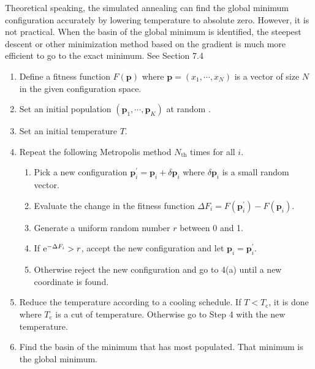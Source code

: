 Theoretical speaking, the simulated annealing can find the global minimum configuration accurately by lowering temperature to absolute zero.  However, it is not practical.  When the basin of the global minimum is identified, the steepest descent or other minimization method based on the gradient is much more efficient to go to the exact minimum. See Section 7.4
\bigskip
\begin{myalgobox}
\label{algo:sa}

\medskip
\begin{minipage}{5.5in}
\small
\begin{enumerate}
\item Define a fitness function $F(\mathbf{p})$ where $\mathbf{p}=(x_1, \cdots, x_N)$ is a vector of size $N$ in the given configuration space.
\item Set an initial population $(\mathbf{p}_1, \cdots, \mathbf{p}_K)$ at random .
\item Set an initial temperature $T$.
\item Repeat the following Metropolis method $N_\text{th}$ times for all $i$.
\begin{enumerate}
\item Pick a new configuration $\mathbf{p}^\prime_i = \mathbf{p}_i + \delta \mathbf{p}_i$ where $\delta \mathbf{p}_i$ is a small random vector.
\item Evaluate the change in the fitness function $\Delta F_i = F(\mathbf{p}^\prime_i) - F(\mathbf{p}_i)$.
\item Generate a uniform random number $r$ between 0 and 1.
\item If $\text{e}^{-\Delta F_i} > r$, accept the new configuration and let $\mathbf{p}_i=\mathbf{p}^\prime_i$. 
\item  Otherwise reject the new configuration and go to 4(a) until a new coordinate is found.
\end{enumerate}
\item Reduce the temperature  according to a cooling schedule.  If $T<T_\text{c}$, it is done where $T_\text{c}$ is a cut of temperature.  Otherwise go to Step 4 with the new temperature.
\item Find the basin of the minimum that has most populated.  That minimum is the global minimum.
\end{enumerate}
\end{minipage}
\end{myalgobox}

